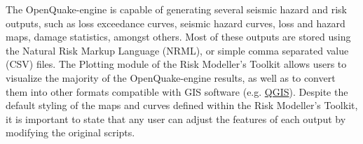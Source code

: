 The OpenQuake-engine is capable of generating several seismic hazard and risk outputs, such as loss exceedance curves, seismic hazard curves, loss and hazard maps, damage statistics, amongst others. Most of these outputs are stored using the Natural Risk Markup Language (NRML), or simple comma separated value (CSV) files. The Plotting module of the Risk Modeller's Toolkit allows users to visualize the majority of the OpenQuake-engine results, as well as to convert them into other formats compatible with GIS software (e.g. \href{http://www.qgis.org/}{QGIS}). Despite the default styling of the maps and curves defined within the Risk Modeller's Toolkit, it is important to state that any user can adjust the features of each output by modifying the original scripts.